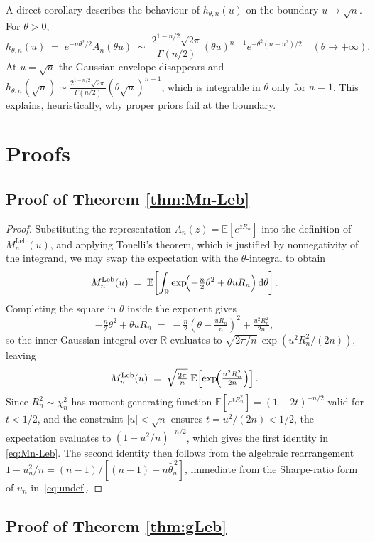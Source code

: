 \documentclass[numsec,webpdf,modern,medium,namedate]{oup-authoring-template}
\theoremstyle{thmstyleone}%
\theoremstyle{thmstyletwo}%
\theoremstyle{thmstylethree}%
\newcommand{\E}{\mathbb{E}}
\newcommand{\dd}{\,\mathrm{d}}
\newcommand{\Leb}{\mathrm{Leb}}
\newcommand{\1}{\mathbf{1}}
\begin{document}
\begin{appendices}
A direct corollary describes the behaviour of \(h_{\theta,n}(u)\) on
the boundary \(u\to\sqrt n\). For \(\theta>0\),
\begin{equation}\label{eq:h-asymp}
  h_{\theta,n}(u)\;=\;e^{-n\theta^2/2}A_n(\theta u)
  \;\sim\;\frac{2^{1-n/2}\sqrt{2\pi}}{\Gamma(n/2)}
   (\theta u)^{n-1}e^{-\theta^2(n-u^2)/2}
   \quad (\theta\to+\infty).
\end{equation}
At \(u=\sqrt n\) the Gaussian envelope disappears and
\(h_{\theta,n}(\sqrt n)\sim \frac{2^{1-n/2}\sqrt{2\pi}}{\Gamma(n/2)}
(\theta\sqrt n)^{n-1}\), which is integrable in \(\theta\) only for
\(n=1\). This explains, heuristically, why proper priors fail at the
boundary.

\section{Proofs}
\subsection{Proof of Theorem \ref{thm:Mn-Leb}}
\begin{proof}
Substituting the representation $A_n(z) = \E[e^{zR_n}]$ into the definition of $M_n^{\Leb}(u)$, and applying Tonelli's theorem, which is justified by nonnegativity of the integrand, we may swap the expectation with the $\theta$-integral to obtain
\[
  M_n^{\Leb}(u) \;=\; \E\!\left[\int_\mathbb{R} \exp\!\Bigl(-\tfrac n2\theta^2 + \theta u R_n\Bigr)\dd\theta\right].
\]
Completing the square in $\theta$ inside the exponent gives
\[
  -\tfrac n2\theta^2 + \theta u R_n
  \;=\; -\tfrac n2\!\left(\theta - \tfrac{u R_n}{n}\right)^{\!2}
  + \tfrac{u^2 R_n^2}{2n},
\]
so the inner Gaussian integral over $\mathbb{R}$ evaluates to
$\sqrt{2\pi/n}\,\exp(u^2 R_n^2/(2n))$, leaving
\[
  M_n^{\Leb}(u)
  \;=\; \sqrt{\tfrac{2\pi}{n}}\;
  \E\!\left[\exp\!\Bigl(\tfrac{u^2 R_n^2}{2n}\Bigr)\right].
\]
Since $R_n^2 \sim \chi_n^2$ has moment generating function
$\E[e^{t R_n^2}] = (1-2t)^{-n/2}$ valid for $t<1/2$, and the constraint
$|u|<\sqrt n$ ensures $t = u^2/(2n) < 1/2$, the expectation evaluates to
$(1 - u^2/n)^{-n/2}$, which gives the first identity in \eqref{eq:Mn-Leb}. The second identity then follows from the algebraic
rearrangement $1 - u_n^2/n = (n-1)/[(n-1) + n\widehat\theta_n^{\,2}]$,
immediate from the Sharpe-ratio form of $u_n$ in~\eqref{eq:undef}.
\end{proof}

\subsection{Proof of Theorem \ref{thm:gLeb}}


\end{appendices}
\end{document}
